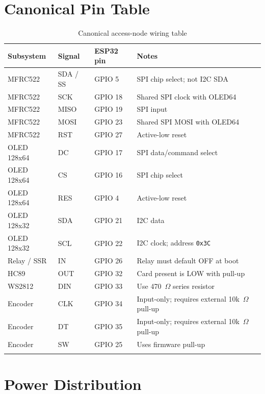 \section{Canonical Pin Table}

\begin{longtable}{L{3cm}L{3cm}L{3.5cm}L{5cm}}
\toprule
\textbf{Subsystem} & \textbf{Signal} & \textbf{ESP32 pin} & \textbf{Notes} \\
\midrule
\endhead
MFRC522 & SDA / SS & GPIO 5 & SPI chip select; not I2C SDA \\
MFRC522 & SCK & GPIO 18 & Shared SPI clock with OLED64 \\
MFRC522 & MISO & GPIO 19 & SPI input \\
MFRC522 & MOSI & GPIO 23 & Shared SPI MOSI with OLED64 \\
MFRC522 & RST & GPIO 27 & Active-low reset \\
OLED 128x64 & DC & GPIO 17 & SPI data/command select \\
OLED 128x64 & CS & GPIO 16 & SPI chip select \\
OLED 128x64 & RES & GPIO 4 & Active-low reset \\
OLED 128x32 & SDA & GPIO 21 & I2C data \\
OLED 128x32 & SCL & GPIO 22 & I2C clock; address \texttt{0x3C} \\
Relay / SSR & IN & GPIO 26 & Relay must default OFF at boot \\
HC89 & OUT & GPIO 32 & Card present is LOW with pull-up \\
WS2812 & DIN & GPIO 33 & Use 470~$\Omega$ series resistor \\
Encoder & CLK & GPIO 34 & Input-only; requires external 10k~$\Omega$ pull-up \\
Encoder & DT & GPIO 35 & Input-only; requires external 10k~$\Omega$ pull-up \\
Encoder & SW & GPIO 25 & Uses firmware pull-up \\
\bottomrule
\caption{Canonical access-node wiring table}
\label{tab:wiring_canonical}
\end{longtable}

\section{Power Distribution}


